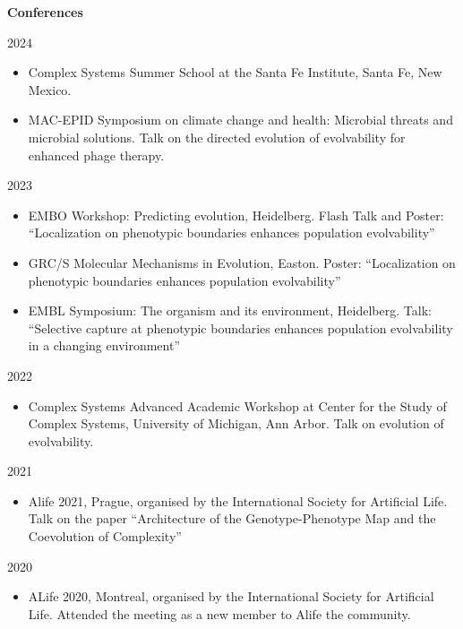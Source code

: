 \documentclass[
  letterpaper,
  DIV=11,
  numbers=noendperiod]{scrartcl}
\providecommand{\tightlist}{%
  \setlength{\itemsep}{0pt}\setlength{\parskip}{0pt}}\usepackage{longtable,booktabs,array}
\begin{document}
\textbf{Conferences}

2024

\begin{itemize}
\item
  Complex Systems Summer School at the Santa Fe Institute, Santa Fe, New
  Mexico.
\item
  MAC-EPID Symposium on climate change and health: Microbial threats and
  microbial solutions. Talk on the directed evolution of evolvability
  for enhanced phage therapy.
\end{itemize}

2023

\begin{itemize}
\item
  EMBO Workshop: Predicting evolution, Heidelberg. Flash Talk and
  Poster: ``Localization on phenotypic boundaries enhances population
  evolvability''
\item
  GRC/S Molecular Mechanisms in Evolution, Easton. Poster:
  ``Localization on phenotypic boundaries enhances population
  evolvability''
\item
  EMBL Symposium: The organism and its environment, Heidelberg. Talk:
  ``Selective capture at phenotypic boundaries enhances population
  evolvability in a changing environment''
\end{itemize}

2022

\begin{itemize}
\tightlist
\item
  Complex Systems Advanced Academic Workshop at Center for the Study of
  Complex Systems, University of Michigan, Ann Arbor. Talk on evolution
  of evolvability.
\end{itemize}

2021

\begin{itemize}
\tightlist
\item
  Alife 2021, Prague, organised by the International Society for
  Artificial Life. Talk on the paper ``Architecture of the
  Genotype-Phenotype Map and the Coevolution of Complexity''
\end{itemize}

2020

\begin{itemize}
\tightlist
\item
  ALife 2020, Montreal, organised by the International Society for
  Artificial Life. Attended the meeting as a new member to Alife the
  community.
\end{itemize}
\end{document}
